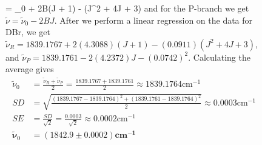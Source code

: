 \documentclass[titlepage]{article}
\begin{document}
\begin{figure}[hbtp]
\tilde{\nu} =  \tilde{\nu}_{0}
+ 2B\left(J + 1\right)
- \alpha\left(J^2 + 4J + 3\right) 
\) and for the P-branch we get \(
    \tilde{\nu} = \tilde{\nu}_{0} - 2BJ
\). After we perform a linear regression on the data for DBr, 
we get \(
\tilde{\nu}_{R} = 1839.1767 + 2\left(
    4.3088
\right)\left(
    J+1
\right) - \left(
    0.0911
\right) \left(
    J^2 + 4J + 3
\right)
\), and \(
\tilde{\nu}_{P} = 1839.1761 - 2\left(
    4.2372
\right)J - \left(
    0.0742
\right)^2
\). Calculating the average gives
\begin{align*}
    \tilde{\nu}_{0} &= \frac{\tilde{\nu}_{R} + \tilde{\nu}_P}{2} 
    = \frac{1839.1767 + 1839.1761}{2} 
    \approx 1839.1764 \mathrm{cm}^{-1} \\
    SD &= \sqrt{
        \frac{
            \left(
                1839.1767 - 1839.1764
            \right)^2
        + \left(
            1839.1761 - 1839.1764
        \right)^2
        }{2}
    } 
    \approx 0.0003 \mathrm{cm}^{-1} \\
    SE &= \frac{SD}{\sqrt{2}} 
    = \frac{0.0003}{\sqrt{2}} 
    \approx 0.0002 \mathrm{cm}^{-1} \\
    \mathbf{\tilde{\nu}}_{0} &= \mathbf{
        \left(
            1842.9 \pm 0.0002
        \right) cm^{-1}
    } \\
\end{align*}
\end{figure}
\end{document}
